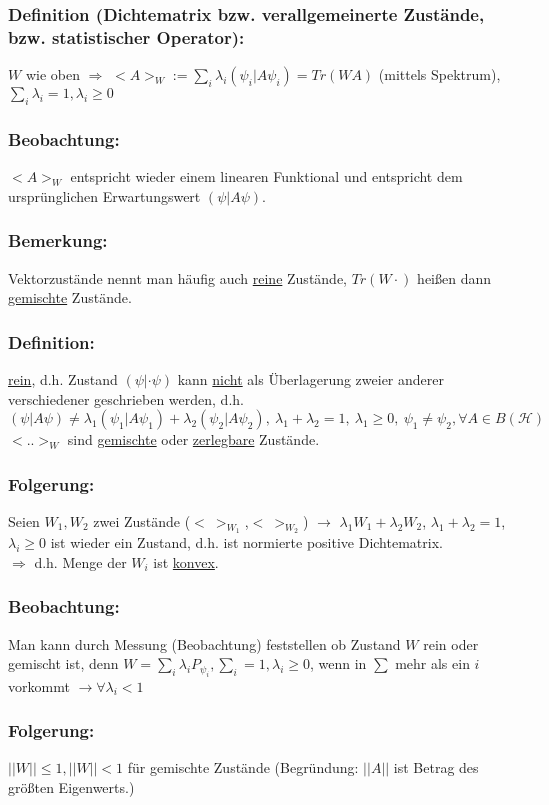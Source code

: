 \documentclass[twoside,a4paper]{scrartcl}
\renewcommand{\1}{\mathds{1}}
\newcommand{\Ra}{\Rightarrow}
\newcommand{\ra}{\rightarrow}
\renewcommand{\l}{\lambda}
\renewcommand{\H}{\mathcal{H}}
\begin{document}
\subsubsection*{Definition (Dichtematrix bzw. verallgemeinerte Zustände, bzw. statistischer Operator):}
$W$ wie oben $\Ra$ $<A>_W:=\sum_i \l_i (\psi_i|A\psi_i)=Tr(WA)$ (mittels Spektrum), $\sum_i \l_i=1, \l_i \geq 0$
\subsubsection*{Beobachtung:}
$<A>_W$ entspricht wieder einem linearen Funktional und entspricht dem ursprünglichen Erwartungswert $(\psi|A\psi)$.
\subsubsection*{Bemerkung:}
Vektorzustände nennt man häufig auch \underline{reine} Zustände, $Tr(W \cdot)$ heißen dann \underline{gemischte} Zustände.
\subsubsection*{Definition:}
 \underline{rein}, d.h. Zustand $(\psi|\cdot \psi)$ kann \underline{nicht} als Überlagerung zweier anderer verschiedener geschrieben werden, d.h. 
$$(\psi|A\psi)\neq \l_1(\psi_1|A\psi_1)+\l_2(\psi_2|A\psi_2), \ \l_1+\l_2=1, \ \l_1 \geq 0, \ \psi_1\neq \psi_2, \forall A \in B(\H)$$
$< .. >_W$ sind \underline{gemischte} oder \underline{zerlegbare} Zustände.
\subsubsection*{Folgerung:}
Seien $W_1,W_2$ zwei Zustände ($< \ >_{W_1}$,$< \ >_{W_2}$) $\ra$ $\l_1 W_1+\l_2 W_2$, $\l_1+\l_2=1$, $\l_i\geq 0$ ist wieder ein Zustand, d.h. ist normierte positive Dichtematrix.\\
$\Ra$ d.h. Menge der $W_i$ ist \underline{konvex}.
\subsubsection*{Beobachtung:}
Man kann durch Messung (Beobachtung) feststellen ob Zustand $W$ rein oder gemischt ist, denn $W=\sum_i \l_i P_{\psi_i}, \sum_i=1, \l_i\geq 0$, wenn in $\sum$ mehr als ein $i$ vorkommt $\ra \forall \l_i <1$ 
\subsubsection*{Folgerung:}
$||W||\leq 1, ||W||<1$ für gemischte Zustände (Begründung: $||A||$ ist Betrag des größten Eigenwerts.)
\end{document}
